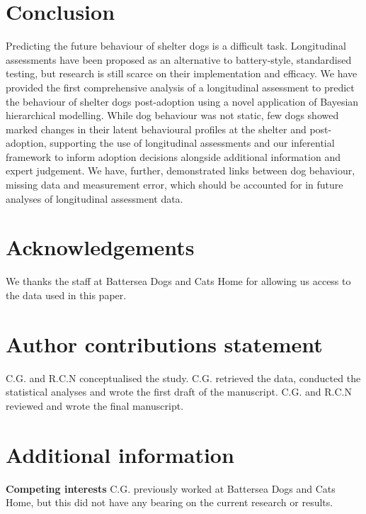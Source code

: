 \documentclass[fleqn,10pt]{wlscirep}
\begin{document}
\section*{Conclusion}
Predicting the future behaviour of shelter dogs is a difficult task. Longitudinal assessments have been proposed as an alternative to battery-style, standardised testing, but research is still scarce on their implementation and efficacy. We have provided the first comprehensive analysis of a longitudinal assessment to predict the behaviour of shelter dogs post-adoption using a novel application of Bayesian hierarchical modelling. While dog behaviour was not static, few dogs showed marked changes in their latent behavioural profiles at the shelter and post-adoption, supporting the use of longitudinal assessments and our inferential framework to inform adoption decisions alongside additional information and expert judgement. We have, further, demonstrated links between dog behaviour, missing data and measurement error, which should be accounted for in future analyses of longitudinal assessment data.



\section*{Acknowledgements}

We thanks the staff at Battersea Dogs and Cats Home for allowing us access to the data used in this paper.

\section*{Author contributions statement}

C.G. and R.C.N conceptualised the study. C.G. retrieved the data, conducted the statistical analyses and wrote the first draft of the manuscript. C.G. and R.C.N reviewed and wrote the final manuscript.

\section*{Additional information}

\textbf{Competing interests} C.G. previously worked at Battersea Dogs and Cats Home, but this did not have any bearing on the current research or results.
\end{document}
